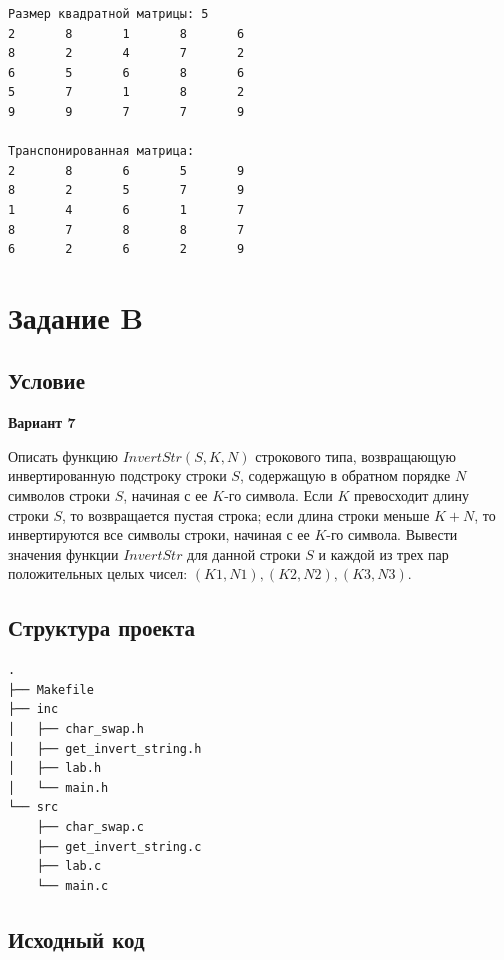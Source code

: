 \documentclass[12pt, a4paper]{article}
\begin{document}
\begin{verbatim}
Размер квадратной матрицы: 5
2       8       1       8       6
8       2       4       7       2
6       5       6       8       6
5       7       1       8       2
9       9       7       7       9

Транспонированная матрица:
2       8       6       5       9
8       2       5       7       9
1       4       6       1       7
8       7       8       8       7
6       2       6       2       9
\end{verbatim}

\labconclusion{}

\newpage

\section{Задание B}

\subsection{Условие}

\begin{center}
    \textbf{Вариант 7}
\end{center}

Описать функцию $InvertStr(S, K, N)$ строкового типа, возвращающую инвертированную подстроку строки $S$, содержащую в обратном порядке $N$ символов строки $S$, начиная с ее $K$-го символа. Если $K$ превосходит длину строки $S$, то возвращается пустая строка; если длина строки меньше $K + N$, то инвертируются все символы строки, начиная с ее $K$-го символа. Вывести значения функции $InvertStr$ для данной строки $S$ и каждой из трех пар положительных целых чисел: $(K1, N1), (K2, N2), (K3, N3)$.

\subsection{Структура проекта}

\begin{verbatim}
.
├── Makefile
├── inc
│   ├── char_swap.h
│   ├── get_invert_string.h
│   ├── lab.h
│   └── main.h
└── src
    ├── char_swap.c
    ├── get_invert_string.c
    ├── lab.c
    └── main.c
\end{verbatim}

\subsection{Исходный код}
\end{document}
